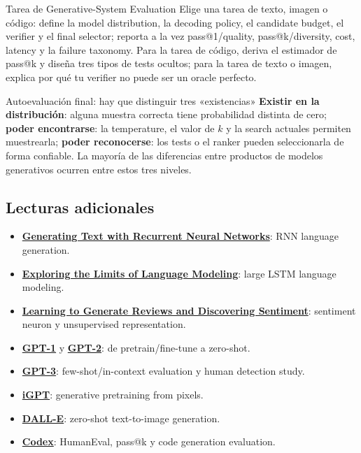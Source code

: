 \begin{importantbox}{Tarea de Generative-System Evaluation}
Elige una tarea de texto, imagen o código: define la model distribution, la decoding policy, el candidate budget, el verifier y el final selector; reporta a la vez pass@1/quality, pass@k/diversity, cost, latency y la failure taxonomy. Para la tarea de código, deriva el estimador de pass@k y diseña tres tipos de tests ocultos; para la tarea de texto o imagen, explica por qué tu verifier no puede ser un oracle perfecto.
\end{importantbox}

\begin{knowledgebox}{Autoevaluación final: hay que distinguir tres «existencias»}
\textbf{Existir en la distribución}: alguna muestra correcta tiene probabilidad distinta de cero; \textbf{poder encontrarse}: la temperature, el valor de $k$ y la search actuales permiten muestrearla; \textbf{poder reconocerse}: los tests o el ranker pueden seleccionarla de forma confiable. La mayoría de las diferencias entre productos de modelos generativos ocurren entre estos tres niveles.
\end{knowledgebox}

\subsection{Lecturas adicionales}

{\small
\begin{itemize}[nosep,leftmargin=*]
  \item \href{https://www.cs.utoronto.ca/~ilya/pubs/2011/LANG-RNN.pdf}{\textbf{Generating Text with Recurrent Neural Networks}}: RNN language generation.
  \item \href{https://arxiv.org/abs/1602.02410}{\textbf{Exploring the Limits of Language Modeling}}: large LSTM language modeling.
  \item \href{https://arxiv.org/abs/1704.01444}{\textbf{Learning to Generate Reviews and Discovering Sentiment}}: sentiment neuron y unsupervised representation.
  \item \href{https://cdn.openai.com/research-covers/language-unsupervised/language_understanding_paper.pdf}{\textbf{GPT-1}} y \href{https://cdn.openai.com/better-language-models/language_models_are_unsupervised_multitask_learners.pdf}{\textbf{GPT-2}}: de pretrain/fine-tune a zero-shot.
  \item \href{https://arxiv.org/abs/2005.14165}{\textbf{GPT-3}}: few-shot/in-context evaluation y human detection study.
  \item \href{https://arxiv.org/abs/2006.10738}{\textbf{iGPT}}: generative pretraining from pixels.
  \item \href{https://arxiv.org/abs/2102.12092}{\textbf{DALL-E}}: zero-shot text-to-image generation.
  \item \href{https://arxiv.org/abs/2107.03374}{\textbf{Codex}}: HumanEval, pass@k y code generation evaluation.
\end{itemize}
}


